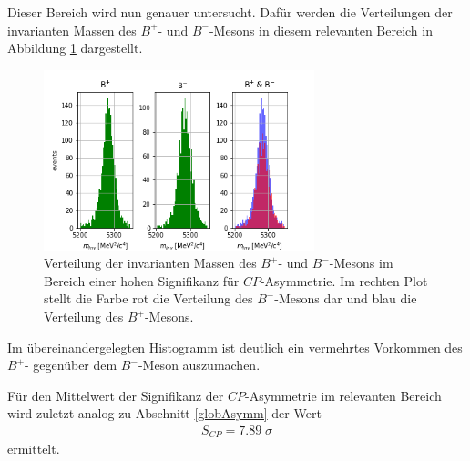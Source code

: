 Dieser Bereich wird nun genauer untersucht. Dafür werden die Verteilungen der invarianten Massen des $B^{+}$- und $B^{-}$-Mesons in diesem relevanten Bereich in Abbildung \ref{fig:AsymmMassen} dargestellt.
\begin{figure}
  \centering
  \includegraphics[width=0.7\textwidth]{plots/Bp_Bm_invarianteMasse.png}
  \caption{Verteilung der invarianten Massen des $B^{+}$- und $B^{-}$-Mesons im Bereich einer hohen Signifikanz für $CP$-Asymmetrie. Im rechten Plot stellt die Farbe rot die Verteilung des $B^{-}$-Mesons dar und blau die Verteilung des $B^{+}$-Mesons.}
  \label{fig:AsymmMassen}
\end{figure}
\FloatBarrier
Im übereinandergelegten Histogramm ist deutlich ein vermehrtes Vorkommen des $B^{+}$- gegenüber dem $B^{-}$-Meson auszumachen.

Für den Mittelwert der Signifikanz der $CP$-Asymmetrie im relevanten Bereich wird zuletzt analog zu Abschnitt \ref{globAsymm} der Wert
\begin{align}
  S_{CP} = 7.89\;\sigma
\end{align}
ermittelt.
